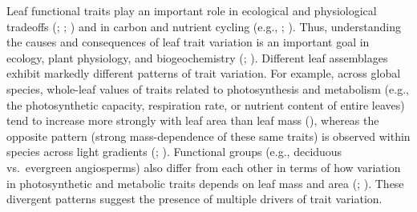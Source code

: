\documentclass[
  12pt,
  letterpaper,
  DIV=11,
  numbers=noendperiod]{scrartcl}
\begin{document}
Leaf functional traits play an important role in ecological and
physiological tradeoffs (;
; ) and in carbon and nutrient cycling (e.g.,
;
). Thus, understanding
the causes and consequences of leaf trait variation is an important goal
in ecology, plant physiology, and biogeochemistry
(;
). Different leaf
assemblages exhibit markedly different patterns of trait variation. For
example, across global species, whole-leaf values of traits related to
photosynthesis and metabolism (e.g., the photosynthetic capacity,
respiration rate, or nutrient content of entire leaves) tend to increase
more strongly with leaf area than leaf mass
(), whereas the opposite
pattern (strong mass-dependence of these same traits) is observed within
species across light gradients (; ). Functional groups
(e.g., deciduous vs.~evergreen angiosperms) also differ from each other
in terms of how variation in photosynthetic and metabolic traits depends
on leaf mass and area (;
). These divergent patterns
suggest the presence of multiple drivers of trait variation.
\end{document}
